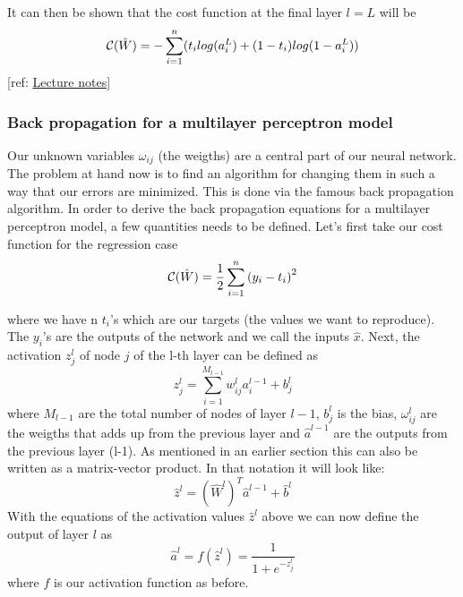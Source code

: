 \documentclass[a4paper,12pt]{article}
\begin{document}
It can then be shown that the cost function at the final layer $l = L$ will be
\begin{equation}
    {\cal C}(\hat{W})  =  -\sum_{i=1}^n( t_i log(a_i^L) + (1-t_i)log(1-a_i^L) )
\end{equation}
[ref: \href{https://compphysics.github.io/MachineLearning/doc/pub/NeuralNet/pdf/NeuralNet-minted.pdf}{Lecture notes}]

\subsubsection{Back propagation for a multilayer perceptron model}
Our unknown variables $\omega_{ij}$ (the weigths) are a central part of our neural network. The problem at hand now is to find an algorithm for changing them in such a way that our errors are minimized. This is done via the famous back propagation algorithm.\newline 
In order to derive the back propagation equations for a multilayer perceptron model, a few quantities needs to be defined. Let's first take our cost function for the regression case 
\begin{equation}
   {\cal C}(\hat{W})  =  \frac{1}{2}\sum_{i=1}^n\left(y_i - t_i\right)^2 
\end{equation}

where we have n $t_i$'s which are our targets (the values we want to reproduce). The $y_i$'s are the outputs of the network and we call the inputs $\hat{x}$.\newline
Next, the activation $z_j^l$ of node $j$ of the l-th layer can be defined as
\begin{equation}
    z_j^l = \sum_{i=1}^{M_{l-1}}w_{ij}^la_i^{l-1}+b_j^l
\end{equation}
where $M_{l-1}$ are the total number of nodes of layer $l-1$, $b_j^l$ is the bias, $\omega_{ij}^l$ are the weigths that adds up from the previous layer and $\hat{a}^{l-1}$ are the outputs from the previous layer (l-1). As mentioned in an earlier section this can also be written as a matrix-vector product. In that notation it will look like:
\begin{equation}
    \hat{z}^l = \left(\hat{W}^l\right)^T\hat{a}^{l-1}+\hat{b}^l
\end{equation}
With the equations of the activation values $\hat{z}^l$ above we can now define the output of layer $l$ as
\begin{equation}
    \hat{a}^l = f(\hat{z}^l) = \frac{1}{1 + e^{-z_j^l}}
\end{equation}
where $f$ is our activation function as before.\newline
\end{document}
